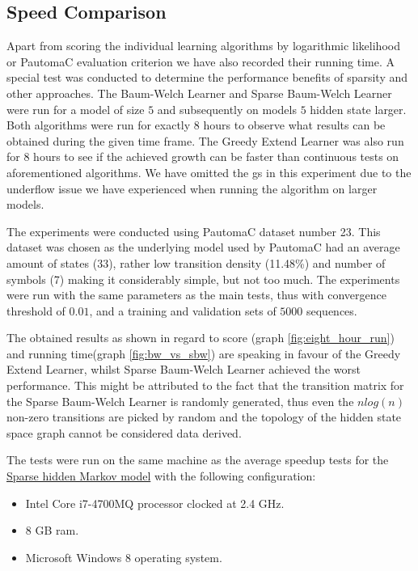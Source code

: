 \subsection{Speed Comparison}
\label{sec:speedrun}
Apart from scoring the individual learning algorithms by logarithmic likelihood or PautomaC evaluation criterion we have also recorded their running time. A special test was conducted to determine the performance benefits of sparsity and other approaches. The Baum-Welch Learner and Sparse Baum-Welch Learner were run for a model of size $5$ and subsequently on models $5$ hidden state larger. Both algorithms were run for exactly 8 hours to observe what results can be obtained during the given time frame. The Greedy Extend Learner was also run for 8 hours to see if the achieved growth can be faster than continuous tests on aforementioned algorithms. We have omitted the \acrlong{gs} in this experiment due to the underflow issue we have experienced when running the algorithm on larger models.

The experiments were conducted using PautomaC dataset number 23. This dataset was chosen as the underlying model used by PautomaC had an average amount of states (33), rather low transition density (11.48\%) and number of symbols (7) making it considerably simple, but not too much. The experiments were run with the same parameters as the main tests, thus with convergence threshold of $0.01$, and a training and validation sets of $5000$ sequences.

The obtained results as shown in regard to score (graph \ref{fig:eight_hour_run}) and running time(graph \ref{fig:bw_vs_sbw}) are speaking in favour of the Greedy Extend Learner, whilst Sparse Baum-Welch Learner achieved the worst performance. This might be attributed to the fact that the transition matrix for the Sparse Baum-Welch Learner is randomly generated, thus even the $nlog(n)$ non-zero transitions are picked by random and the topology of the hidden state space graph cannot be considered data derived.

The tests were run on the same machine as the average speedup tests for the \hyperref[sec:shmm]{Sparse hidden Markov model} with the following configuration:
\begin{itemize}
	\item[] Intel Core i7-4700MQ processor clocked at 2.4 GHz.
	\item[] 8 GB \gls{ram}.
	\item[] Microsoft Windows 8 operating system.
\end{itemize}

